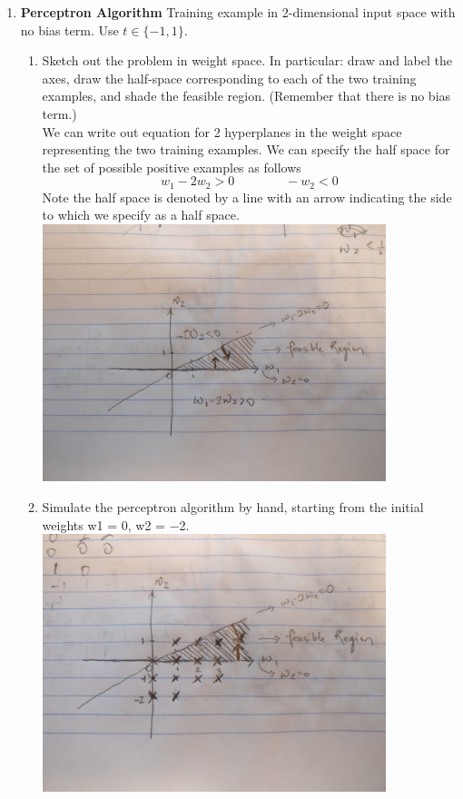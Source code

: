 \documentclass[11pt]{article}
\begin{document}
\begin{enumerate}
\item \textbf{Perceptron Algorithm} Training example in 2-dimensional input space with no bias term. Use $t\in \{-1,1\}$. 

\begin{enumerate}
    \item Sketch out the problem in weight space. In particular: draw and label the axes, draw the half-space corresponding to each of the two training examples, and shade the feasible region. (Remember that there is no bias term.) \\
    We can write out equation for 2 hyperplanes in the weight space representing the two training examples. We can specify the half space for the set of possible positive examples as follows
    \[
        w_1 -2w_2 > 0 
        \quad \quad \quad \quad 
        -w_2 < 0
    \]
    Note the half space is denoted by a line with an arrow indicating the side to which we specify as a half space. \\
    \includegraphics[width=10cm]{weightspace.jpg}
    \item  Simulate the perceptron algorithm by hand, starting from the initial weights w1 = 0, w2 = −2. \\ 
    \includegraphics[width=10cm]{perceptrontrace.jpg}
\end{enumerate} 


\end{enumerate}
\end{document}
